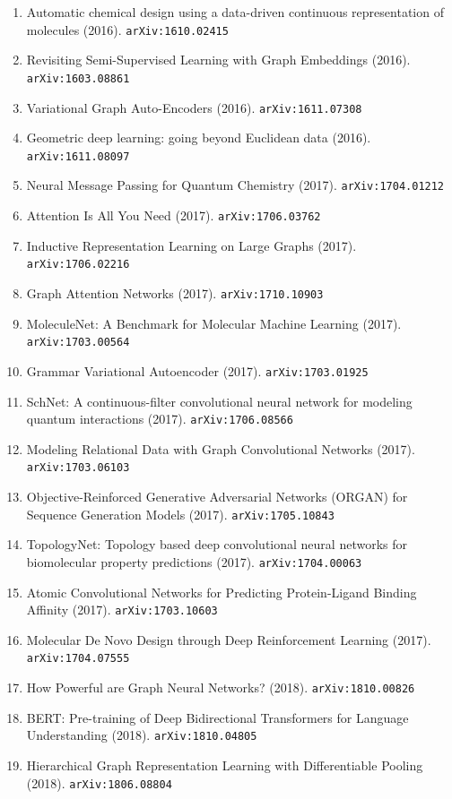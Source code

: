 \documentclass[11pt]{article}
\begin{document}
\begin{enumerate}
  \item Automatic chemical design using a data-driven continuous representation
  of molecules (2016). \texttt{arXiv:1610.02415}
  \item Revisiting Semi-Supervised Learning with Graph Embeddings (2016). \texttt{arXiv:1603.08861}
  \item Variational Graph Auto-Encoders (2016). \texttt{arXiv:1611.07308}
  \item Geometric deep learning: going beyond Euclidean data (2016). \texttt{arXiv:1611.08097}
  \item Neural Message Passing for Quantum Chemistry (2017). \texttt{arXiv:1704.01212}
  \item Attention Is All You Need (2017). \texttt{arXiv:1706.03762}
  \item Inductive Representation Learning on Large Graphs (2017). \texttt{arXiv:1706.02216}
  \item Graph Attention Networks (2017). \texttt{arXiv:1710.10903}
  \item MoleculeNet: A Benchmark for Molecular Machine Learning (2017). \texttt{arXiv:1703.00564}
  \item Grammar Variational Autoencoder (2017). \texttt{arXiv:1703.01925}
  \item SchNet: A continuous-filter convolutional neural network for modeling
  quantum interactions (2017). \texttt{arXiv:1706.08566}
  \item Modeling Relational Data with Graph Convolutional Networks (2017). \texttt{arXiv:1703.06103}
  \item Objective-Reinforced Generative Adversarial Networks (ORGAN) for
  Sequence Generation Models (2017). \texttt{arXiv:1705.10843}
  \item TopologyNet: Topology based deep convolutional neural networks for
  biomolecular property predictions (2017). \texttt{arXiv:1704.00063}
  \item Atomic Convolutional Networks for Predicting Protein-Ligand Binding
  Affinity (2017). \texttt{arXiv:1703.10603}
  \item Molecular De Novo Design through Deep Reinforcement Learning (2017). \texttt{arXiv:1704.07555}
  \item How Powerful are Graph Neural Networks? (2018). \texttt{arXiv:1810.00826}
  \item BERT: Pre-training of Deep Bidirectional Transformers for Language
  Understanding (2018). \texttt{arXiv:1810.04805}
  \item Hierarchical Graph Representation Learning with Differentiable Pooling (2018). \texttt{arXiv:1806.08804}

\end{enumerate}
\end{document}

